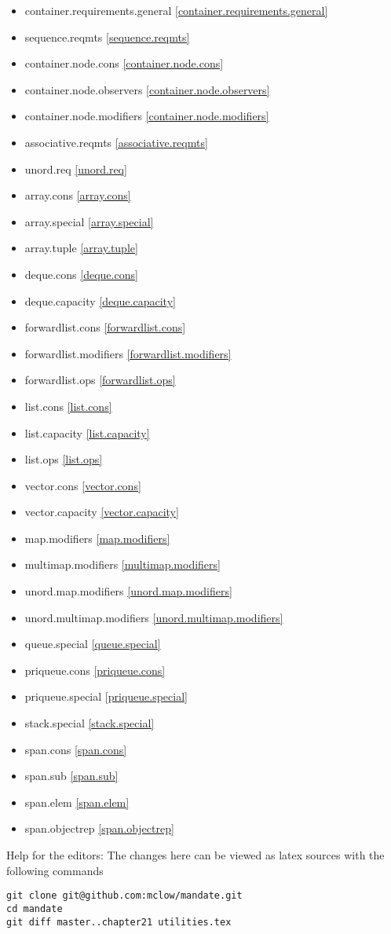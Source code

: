 \begin{multicols}{2}
\begin{itemize}
\item{container.requirements.general  \ref{container.requirements.general}}
\item{sequence.reqmts      \ref{sequence.reqmts}}
\item{container.node.cons       \ref{container.node.cons}}
\item{container.node.observers   \ref{container.node.observers}}
\item{container.node.modifiers              \ref{container.node.modifiers}}
\item{associative.reqmts          \ref{associative.reqmts}}
\item{unord.req            \ref{unord.req}}

\item{array.cons               \ref{array.cons}}
\item{array.special             \ref{array.special}}
\item{array.tuple              \ref{array.tuple}}
\item{deque.cons          \ref{deque.cons}}
\item{deque.capacity            \ref{deque.capacity}}
\item{forwardlist.cons          \ref{forwardlist.cons}}
\item{forwardlist.modifiers  \ref{forwardlist.modifiers}}
\item{forwardlist.ops   \ref{forwardlist.ops}}
\item{list.cons   \ref{list.cons}}
\item{list.capacity   \ref{list.capacity}}
\item{list.ops   \ref{list.ops}}
\item{vector.cons   \ref{vector.cons}}
\item{vector.capacity   \ref{vector.capacity}}

\item{map.modifiers   \ref{map.modifiers}}
\item{multimap.modifiers   \ref{multimap.modifiers}}
\item{unord.map.modifiers  \ref{unord.map.modifiers}}
\item{unord.multimap.modifiers  \ref{unord.multimap.modifiers}}

\item{queue.special  \ref{queue.special}}
\item{priqueue.cons  \ref{priqueue.cons}}
\item{priqueue.special  \ref{priqueue.special}}
\item{stack.special  \ref{stack.special}}
\item{span.cons  \ref{span.cons}}

\item{span.sub  \ref{span.sub}}
\item{span.elem  \ref{span.elem}}
\item{span.objectrep  \ref{span.objectrep}}
\end{itemize}
\end{multicols}

\vfill
Help for the editors: The changes here can be viewed as latex sources with the following commands
\begin{verbatim}
git clone git@github.com:mclow/mandate.git
cd mandate
git diff master..chapter21 utilities.tex
\end{verbatim}
\newpage
